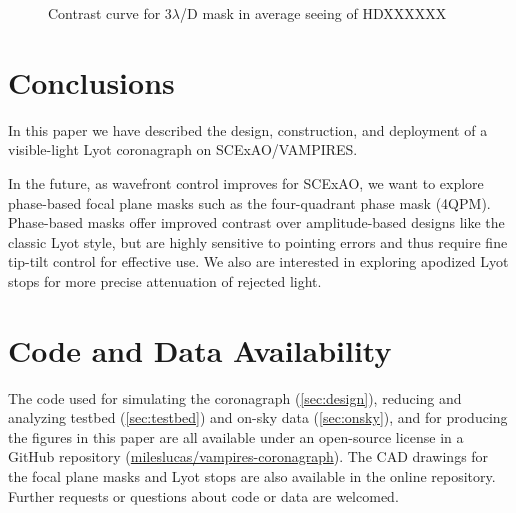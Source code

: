 \documentclass[]{spie}  %
\begin{document}
\begin{figure*}[h!]
   \centering
   \caption{Contrast curve for 3$\lambda$/D mask in average seeing of HDXXXXXX}\label{fig:onsky-contrast}
\end{figure*}

\section{Conclusions}\label{sec:conclusions}

In this paper we have described the design, construction, and deployment of a visible-light Lyot coronagraph on SCExAO/VAMPIRES.

In the future, as wavefront control improves for SCExAO, we want to explore phase-based focal plane masks such as the four-quadrant phase mask (4QPM)\cite{rouanFourQuadrantPhase2007}. Phase-based masks offer improved contrast over amplitude-based designs like the classic Lyot style, but are highly sensitive to pointing errors and thus require fine tip-tilt control for effective use\cite{huby2017}. We also are interested in exploring apodized Lyot stops for more precise attenuation of rejected light.


\appendix    %


\section{Code and Data Availability}\label{sec:code}

The code used for simulating the coronagraph (\autoref{sec:design}), reducing and analyzing testbed (\autoref{sec:testbed}) and on-sky data (\autoref{sec:onsky}), and for producing the figures in this paper are all available under an open-source license in a GitHub repository (\href{https://github.com/mileslucas/vampires-coronagraph}{mileslucas/vampires-coronagraph}). The CAD drawings for the focal plane masks and Lyot stops are also available in the online repository. Further requests or questions about code or data are welcomed.

\acknowledgments




\end{document}
